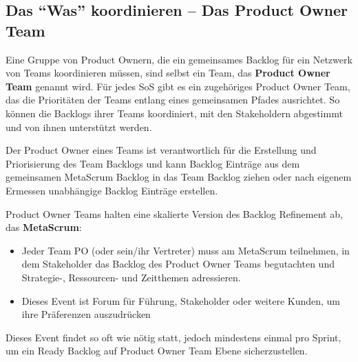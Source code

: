 \documentclass[12pt,a4paper,parskip=full]{scrartcl}
\begin{document}
\subsection{Das ``Was'' koordinieren – Das Product Owner Team}
Eine Gruppe von Product Ownern, die ein gemeinsames Backlog für ein Netzwerk
von Teams koordinieren müssen, sind selbst ein Team, das \textbf{Product Owner Team}
genannt wird. Für jedes SoS gibt es ein zugehöriges Product Owner Team, das die
Prioritäten der Teams entlang eines gemeinsamen Pfades ausrichtet. So können die
Backlogs ihrer Teams koordiniert, mit den Stakeholdern abgestimmt und von
ihnen unterstützt werden.

Der Product Owner eines Teams ist verantwortlich für die Erstellung und
Priorisierung des Team Backlogs und kann Backlog Einträge aus dem gemeinsamen
MetaScrum Backlog in das Team Backlog ziehen oder nach eigenem Ermessen
unabhängige Backlog Einträge erstellen.

Product Owner Teams halten eine skalierte Version des Backlog Refinement ab, das \textbf{MetaScrum}:
\begin{itemize}
\item Jeder Team PO (oder sein/ihr Vertreter) muss am MetaScrum teilnehmen, in dem Stakeholder das Backlog des Product Owner Teams begutachten und Strategie-, Ressourcen- und Zeitthemen adressieren.
\item Dieses Event ist Forum für Führung, Stakeholder oder weitere
Kunden, um ihre Präferenzen auszudrücken
\end{itemize}
Dieses Event findet so oft wie nötig statt, jedoch mindestens einmal pro Sprint,
um ein Ready Backlog auf Product Owner Team Ebene sicherzustellen.
\end{document}
